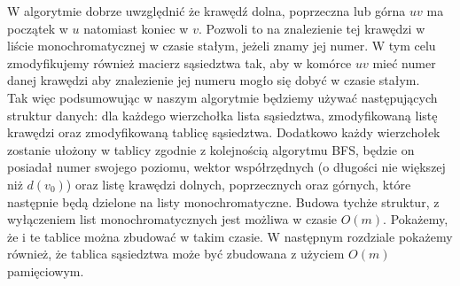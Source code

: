 \documentclass[12pt,a4paper,titlepage]{article}
\begin{document}
W algorytmie dobrze uwzględnić że krawędź dolna, poprzeczna lub górna $uv$ ma początek w $u$ natomiast koniec w $v$. Pozwoli to na znalezienie tej krawędzi w liście monochromatycznej w czasie stałym, jeżeli znamy jej numer. W tym celu zmodyfikujemy również macierz sąsiedztwa tak, aby w komórce $uv$ mieć numer danej krawędzi aby znalezienie jej numeru mogło się dobyć w czasie stałym. \\
Tak więc podsumowując w naszym algorytmie będziemy używać następujących struktur danych: dla każdego wierzchołka lista sąsiedztwa, zmodyfikowaną listę krawędzi oraz zmodyfikowaną tablicę sąsiedztwa. Dodatkowo każdy wierzchołek zostanie ułożony w tablicy zgodnie z kolejnością algorytmu BFS, będzie on posiadał numer swojego poziomu, wektor współrzędnych (o długości nie większej niż $d(v_0)$) oraz listę krawędzi dolnych, poprzecznych oraz górnych, które następnie będą dzielone na listy monochromatyczne. Budowa tychże struktur, z wyłączeniem list monochromatycznych jest możliwa w czasie $O(m)$. Pokażemy, że i te tablice można zbudować w takim czasie. W następnym rozdziale pokażemy również, że tablica sąsiedztwa może być zbudowana z użyciem $O(m)$ pamięciowym. \\
\\
\end{document}

